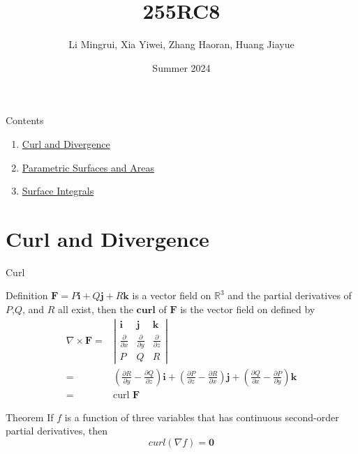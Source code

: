\documentclass{beamer}
\title{\LARGE 255RC8}
\author{ Li Mingrui, Xia Yiwei, Zhang Haoran, Huang Jiayue}
\date{Summer 2024}
\begin{document}
\maketitle



\begin{frame}{Contents}
    \begin{enumerate}
        \item \hyperlink{1}{Curl and Divergence}
        \item \hyperlink{2}{Parametric Surfaces and Areas}
        \item \hyperlink{3}{Surface Integrals}
    \end{enumerate}
       
\end{frame}

    

\section{Curl and Divergence}
\begin{frame}{Curl}

    \begin{block}{Definition}
$\boldsymbol{F}=P\boldsymbol{i}+Q\boldsymbol{j}+R\boldsymbol{k}$ is a vector field on $\mathbb{R}^3$ and the partial derivatives of $P$,$Q$, and $R$ all exist, then the $\boldsymbol{curl}$ of $\boldsymbol{F}$ is the vector field on defined by
    \begin{align*}
        \nabla\times \boldsymbol{F} = &
        \left|
        \begin{array}{ccc}
            \boldsymbol{i}& \boldsymbol{j}& \boldsymbol{k}\\
            \frac{\partial}{\partial x}& \frac{\partial}{\partial y}&\frac{\partial}{\partial z}\\
            P&Q&R
        \end{array}
        \right| \\
        =& (\frac{\partial R}{\partial y}-\frac{\partial Q}{\partial z})\boldsymbol{i}+(\frac{\partial P}{\partial z}-\frac{\partial R}{\partial x})\boldsymbol{j}+(\frac{\partial Q}{\partial x}-\frac{\partial P}{\partial y})\boldsymbol{k}\\
        =&\text{curl } \boldsymbol{F}
    \end{align*}
    \end{block}

    \begin{block}{Theorem}
        If $f$ is a function of three variables that has continuous second-order partial derivatives, then
        \begin{equation*}
            curl(\nabla f)=\boldsymbol{0}
        \end{equation*}
    \end{block}
\end{frame}
\end{document}
